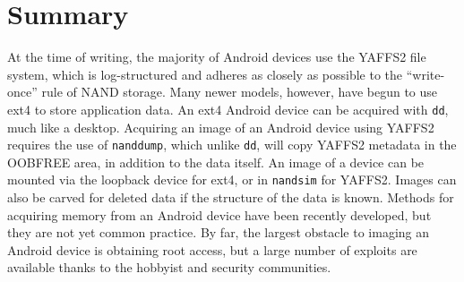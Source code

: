 \section{Summary}
At the time of writing, the majority of Android devices use the YAFFS2 file system, which is log-structured and adheres as closely
as possible to the ``write-once'' rule of NAND storage.  Many newer models, however, have begun to use ext4 to store application
data. An ext4 Android device can be acquired with \texttt{dd}, much like a desktop. Acquiring an image of an Android device using
YAFFS2 requires the use of \texttt{nanddump}, which unlike \texttt{dd}, will copy YAFFS2 metadata in the OOBFREE area, in addition to
the data itself.  An image of a device can be mounted via the loopback device for ext4, or in \texttt{nandsim} for YAFFS2. Images
can also be carved for deleted data if the structure of the data is known. Methods for acquiring memory from an Android device have
been recently developed, but they are not yet common practice. By far, the largest obstacle to imaging an Android device is
obtaining root access, but a large number of exploits are available thanks to the hobbyist and security communities.
